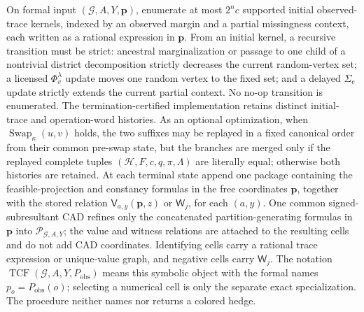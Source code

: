 On formal input \((\mathcal G,A,Y,\mathbf p)\), enumerate at most \(2^n c\) supported initial observed-trace kernels, indexed by an observed margin and a partial missingness context, each written as a rational expression in \(\mathbf p\). From an initial kernel, a recursive transition must be strict: ancestral marginalization or passage to one child of a nontrivial district decomposition strictly decreases the current random-vertex set; a licensed \(\Phi_v^{\lambda}\) update moves one random vertex to the fixed set; and a delayed \(\Sigma_c\) update strictly extends the current partial context. No no-op transition is enumerated. The termination-certified implementation retains distinct initial-trace and operation-word histories. As an optional optimization, when \(\operatorname{Swap}_{\kappa}(u,v)\) holds, the two suffixes may be replayed in a fixed canonical order from their common pre-swap state, but the branches are merged only if the replayed complete tuples \((\mathcal H,F,c,q,\pi,\Lambda)\) are literally equal; otherwise both histories are retained. At each terminal state append one package containing the feasible-projection and constancy formulas in the free coordinates \(\mathbf p\), together with the stored relation \(\mathsf V_{a,y}(\mathbf p,z)\) or \(\mathsf W_j\), for each \((a,y)\). One common signed-subresultant CAD refines only the concatenated partition-generating formulas in \(\mathbf p\) into \(\mathscr P_{\mathcal G,A,Y}\); the value and witness relations are attached to the resulting cells and do not add CAD coordinates. Identifying cells carry a rational trace expression or unique-value graph, and negative cells carry \(\mathsf W_j\). The notation \(\operatorname{TCF}(\mathcal G,A,Y,P_{\mathrm{obs}})\) means this symbolic object with the formal names \(p_o=P_{\mathrm{obs}}(o)\); selecting a numerical cell is only the separate exact specialization. The procedure neither names nor returns a colored hedge.